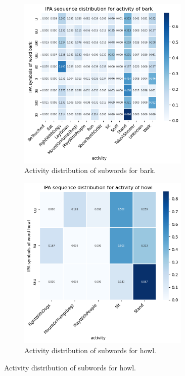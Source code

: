\documentclass[letterpaper]{article}
\begin{document}
\begin{figure}[h]
\centering
\begin{subfigure}[]{0.4\textwidth}
	\centering
	\includegraphics[width=0.9\textwidth]{images/ipa_bark.png}
	\caption{Activity distribution of subwords for bark.}
	\label{fig:1}
\end{subfigure}
\begin{subfigure}[]{0.4\textwidth}
	\centering
	\includegraphics[width=0.9\textwidth]{images/ipa_howl.png}
	\caption{Activity distribution of subwords for howl.}
	\label{fig:2}
\end{subfigure}


\end{figure}
\end{document}
